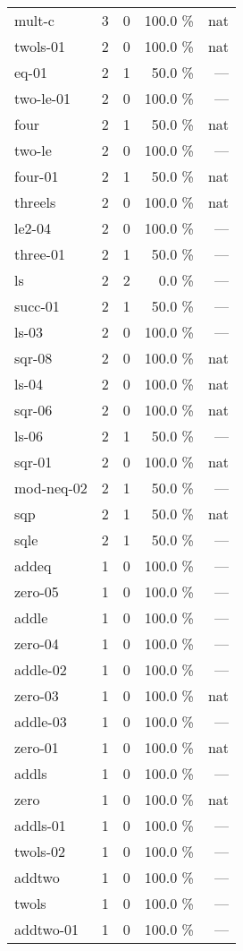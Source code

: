 \documentclass[a4paper]{article}
\begin{document}
\begin{supertabular}{l|r|r|r|r}
mult-c & 3 & 0 & 100.0 \% & nat\\
twols-01 & 2 & 0 & 100.0 \% & nat\\
eq-01 & 2 & 1 & 50.0 \% & ---\\
two-le-01 & 2 & 0 & 100.0 \% & ---\\
four & 2 & 1 & 50.0 \% & nat\\
two-le & 2 & 0 & 100.0 \% & ---\\
four-01 & 2 & 1 & 50.0 \% & nat\\
threels & 2 & 0 & 100.0 \% & nat\\
le2-04 & 2 & 0 & 100.0 \% & ---\\
three-01 & 2 & 1 & 50.0 \% & ---\\
ls & 2 & 2 & 0.0 \% & ---\\
succ-01 & 2 & 1 & 50.0 \% & ---\\
ls-03 & 2 & 0 & 100.0 \% & ---\\
sqr-08 & 2 & 0 & 100.0 \% & nat\\
ls-04 & 2 & 0 & 100.0 \% & nat\\
sqr-06 & 2 & 0 & 100.0 \% & nat\\
ls-06 & 2 & 1 & 50.0 \% & ---\\
sqr-01 & 2 & 0 & 100.0 \% & nat\\
mod-neq-02 & 2 & 1 & 50.0 \% & ---\\
sqp & 2 & 1 & 50.0 \% & nat\\
sqle & 2 & 1 & 50.0 \% & ---\\
addeq & 1 & 0 & 100.0 \% & ---\\
zero-05 & 1 & 0 & 100.0 \% & ---\\
addle & 1 & 0 & 100.0 \% & ---\\
zero-04 & 1 & 0 & 100.0 \% & ---\\
addle-02 & 1 & 0 & 100.0 \% & ---\\
zero-03 & 1 & 0 & 100.0 \% & nat\\
addle-03 & 1 & 0 & 100.0 \% & ---\\
zero-01 & 1 & 0 & 100.0 \% & nat\\
addls & 1 & 0 & 100.0 \% & ---\\
zero & 1 & 0 & 100.0 \% & nat\\
addls-01 & 1 & 0 & 100.0 \% & ---\\
twols-02 & 1 & 0 & 100.0 \% & ---\\
addtwo & 1 & 0 & 100.0 \% & ---\\
twols & 1 & 0 & 100.0 \% & ---\\
addtwo-01 & 1 & 0 & 100.0 \% & ---\\

\end{supertabular}
\end{document}
